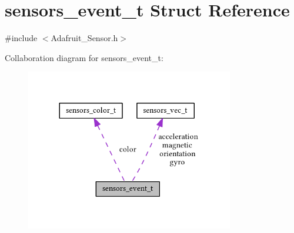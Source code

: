 \hypertarget{structsensors__event__t}{}\section{sensors\+\_\+event\+\_\+t Struct Reference}
\label{structsensors__event__t}


{\ttfamily \#include $<$Adafruit\+\_\+\+Sensor.\+h$>$}



Collaboration diagram for sensors\+\_\+event\+\_\+t\+:\nopagebreak
\begin{figure}[H]
\begin{center}
\leavevmode
\includegraphics[width=257pt]{structsensors__event__t__coll__graph}
\end{center}
\end{figure}
